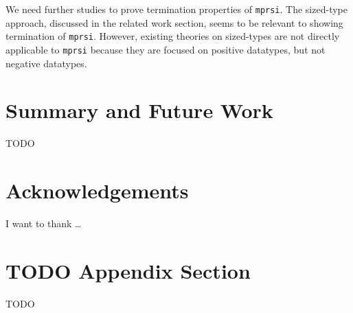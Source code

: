 \documentclass[a4paper,UKenglish]{lipics}
\begin{document}
We need further studies to prove termination properties of \lstinline{mprsi}.
The sized-type approach, discussed in the related work section,
seems to be relevant to showing termination of \lstinline{mprsi}.
However, existing theories on sized-types are not directly applicable to
\lstinline{mprsi} because they are focused on positive datatypes, but
not negative datatypes.


\section{Summary and Future Work}
TODO



\section*{Acknowledgements}
I want to thank \dots

\appendix
\section{TODO Appendix Section}
TODO


\end{document}
